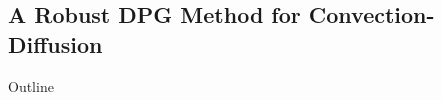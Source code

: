 \documentclass[compress]{beamer}
\newcommand{\nor}[1]{\left\| #1 \right\|}
\newcommand{\LRp}[1]{\left( #1 \right)}
\newcommand{\LRs}[1]{\left[ #1 \right]}
\newcommand{\LRa}[1]{\left\langle #1 \right\rangle}
\newcommand{\jump}[1] {\ensuremath{\LRs{\![#1]\!}}}
\renewcommand{\L}{L^2\LRp{\Omega}}
\newcommand{\Gh}{\Gamma_h}
\newcommand{\Oh}{\Omega_h}
\begin{document}



\subsection{A Robust DPG Method for Convection-Diffusion}
\begin{frame}{Outline}
  \tableofcontents[currentsection]
\end{frame}
\end{document}
